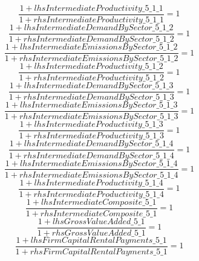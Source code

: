 \begin{dmath}
\frac{1+{lhsIntermediateProductivity\_5\_1\_1}}{1+{rhsIntermediateProductivity\_5\_1\_1}}=1
\end{dmath}
\begin{dmath}
\frac{1+{lhsIntermediateDemandBySector\_5\_1\_2}}{1+{rhsIntermediateDemandBySector\_5\_1\_2}}=1
\end{dmath}
\begin{dmath}
\frac{1+{lhsIntermediateEmissionsBySector\_5\_1\_2}}{1+{rhsIntermediateEmissionsBySector\_5\_1\_2}}=1
\end{dmath}
\begin{dmath}
\frac{1+{lhsIntermediateProductivity\_5\_1\_2}}{1+{rhsIntermediateProductivity\_5\_1\_2}}=1
\end{dmath}
\begin{dmath}
\frac{1+{lhsIntermediateDemandBySector\_5\_1\_3}}{1+{rhsIntermediateDemandBySector\_5\_1\_3}}=1
\end{dmath}
\begin{dmath}
\frac{1+{lhsIntermediateEmissionsBySector\_5\_1\_3}}{1+{rhsIntermediateEmissionsBySector\_5\_1\_3}}=1
\end{dmath}
\begin{dmath}
\frac{1+{lhsIntermediateProductivity\_5\_1\_3}}{1+{rhsIntermediateProductivity\_5\_1\_3}}=1
\end{dmath}
\begin{dmath}
\frac{1+{lhsIntermediateDemandBySector\_5\_1\_4}}{1+{rhsIntermediateDemandBySector\_5\_1\_4}}=1
\end{dmath}
\begin{dmath}
\frac{1+{lhsIntermediateEmissionsBySector\_5\_1\_4}}{1+{rhsIntermediateEmissionsBySector\_5\_1\_4}}=1
\end{dmath}
\begin{dmath}
\frac{1+{lhsIntermediateProductivity\_5\_1\_4}}{1+{rhsIntermediateProductivity\_5\_1\_4}}=1
\end{dmath}
\begin{dmath}
\frac{1+{lhsIntermediateComposite\_5\_1}}{1+{rhsIntermediateComposite\_5\_1}}=1
\end{dmath}
\begin{dmath}
\frac{1+{lhsGrossValueAdded\_5\_1}}{1+{rhsGrossValueAdded\_5\_1}}=1
\end{dmath}
\begin{dmath}
\frac{1+{lhsFirmCapitalRentalPayments\_5\_1}}{1+{rhsFirmCapitalRentalPayments\_5\_1}}=1
\end{dmath}
